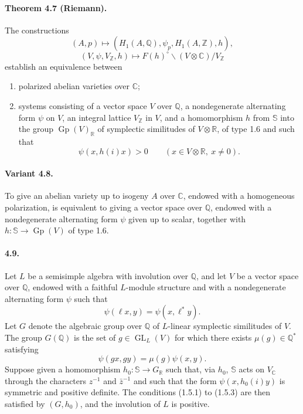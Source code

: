 \documentclass[10pt]{article}
\newcommand{\C}{\mathbb C}
\newcommand{\Q}{\mathbb Q}
\newcommand{\R}{\mathbb R}
\newcommand{\Z}{\mathbb Z}
\newcommand{\bS}{\mathbb S}
\newcommand{\GL}{\operatorname{GL}}
\newcommand{\Gp}{\operatorname{Gp}}
\begin{document}
\paragraph{Theorem 4.7 (Riemann).} The constructions
\[
(A,p)\longmapsto (H_1(A,\Q),\psi_p,H_1(A,\Z),h),
\]
\[
(V,\psi,V_\Z,h)\longmapsto
F(h)^\circ\backslash (V\otimes\C)/V_\Z
\]
establish an equivalence between
\begin{enumerate}[label=(\alph*)]
\item polarized abelian varieties over $\C$;
\item systems consisting of a vector space $V$ over $\Q$, a nondegenerate alternating form $\psi$ on $V$, an integral lattice $V_\Z$ in $V$, and a homomorphism $h$ from $\bS$ into the group $\Gp(V)_\R$ of symplectic similitudes of $V\otimes\R$, of type 1.6 and such that
\[
\psi(x,h(i)x)>0\qquad(x\in V\otimes\R,\ x\ne0).
\]
\end{enumerate}

\paragraph{Variant 4.8.} To give an abelian variety up to isogeny $A$ over $\C$, endowed with a homogeneous polarization, is equivalent to giving a vector space over $\Q$, endowed with a nondegenerate alternating form $\psi$ given up to scalar, together with $h:\bS\longrightarrow\Gp(V)$ of type 1.6.

\paragraph{4.9.} Let $L$ be a semisimple algebra with involution over $\Q$, and let $V$ be a vector space over $\Q$, endowed with a faithful $L$-module structure and with a nondegenerate alternating form $\psi$ such that
\[
\tag{4.9.1}
\psi(\ell x,y)=\psi(x,\ell^*y).
\]
Let $G$ denote the algebraic group over $\Q$ of $L$-linear symplectic similitudes of $V$. The group $G(\Q)$ is the set of $g\in\GL_L(V)$ for which there exists $\mu(g)\in\Q^*$ satisfying
\[
\tag{4.9.2}
\psi(gx,gy)=\mu(g)\psi(x,y).
\]
Suppose given a homomorphism $h_0:\bS\longrightarrow G_\R$ such that, via $h_0$, $\bS$ acts on $V_\C$ through the characters $z^{-1}$ and $\bar z^{-1}$ and such that the form $\psi(x,h_0(i)y)$ is symmetric and positive definite. The conditions (1.5.1) to (1.5.3) are then satisfied by $(G,h_0)$, and the involution of $L$ is positive.
\end{document}
